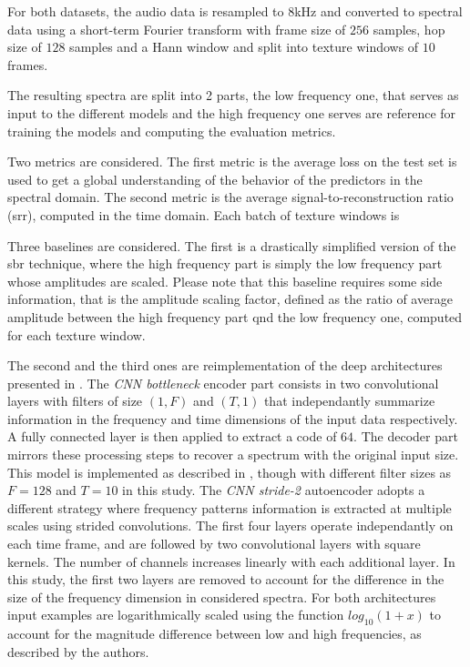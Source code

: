 \documentclass{article}
\begin{document}
For both datasets, the audio data is resampled to $8$kHz and converted to spectral data using a short-term Fourier transform with frame size of $256$ samples, hop size of $128$ samples and a Hann window and split into texture windows of $10$ frames.

The resulting spectra are split into 2 parts, the low frequency one, that serves as input to the different models and the high frequency one serves are reference for training the models and computing the evaluation metrics.

Two metrics are considered. The first metric is the average loss on the test set is used to get a global understanding of the behavior of the predictors in the spectral domain. The second metric is the average signal-to-reconstruction ratio (srr), computed in the time domain. Each batch of texture windows is

Three baselines are considered. The first is a drastically simplified version of the sbr technique, where the high frequency part is simply the low frequency part whose amplitudes are scaled. Please note that this baseline requires some side information, that is the amplitude scaling factor, defined as the ratio of average amplitude between the high frequency part qnd the low frequency one, computed for each texture window.

The second and the third ones are reimplementation of the deep architectures presented in \cite{miron2018high}. The \textit{CNN bottleneck} encoder part consists in two convolutional layers with filters of size $(1, F)$ and $(T, 1)$ that independantly summarize information in the frequency and time dimensions of the input data respectively. A fully connected layer is then applied to extract a code of $64$. The decoder part mirrors these processing steps to recover a spectrum with the original input size. This model is implemented as described in \cite{miron2018high}, though with different filter sizes as $F=128$ and $T=10$ in this study. The \textit{CNN stride-2} autoencoder adopts a different strategy where frequency patterns information is extracted at multiple scales using strided convolutions. The first four layers operate independantly on each time frame, and are followed by two convolutional layers with square kernels. The number of channels increases linearly with each additional layer. In this study, the first two layers are removed to account for the difference in the size of the frequency dimension in considered spectra. For both architectures input examples are logarithmically scaled using the function $log_{10}(1+x)$ to account for the magnitude difference between low and high frequencies, as described by the authors.
\end{document}
